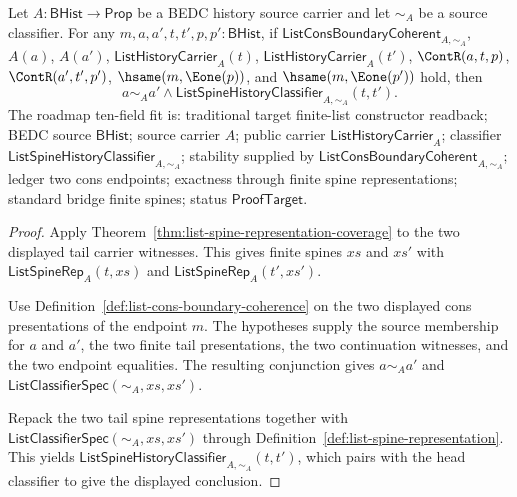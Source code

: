 \begin{theorem}
\label{thm:list-public-cons-readback-deterministic}
Let $A:\mathsf{BHist}\to\mathsf{Prop}$ be a BEDC history source carrier and let
$\sim_A$ be a source classifier. For any
$m,a,a',t,t',p,p':\mathsf{BHist}$, if
$\mathsf{ListConsBoundaryCoherent}_{A,\sim_A}$,
$A(a)$, $A(a')$, $\mathsf{ListHistoryCarrier}_A(t)$,
$\mathsf{ListHistoryCarrier}_A(t')$, $\ContR(a,t,p)$,
$\ContR(a',t',p')$, $\hsame(m,\Eone(p))$, and
$\hsame(m,\Eone(p'))$ hold, then
$$
a\sim_A a'\land
\mathsf{ListSpineHistoryClassifier}_{A,\sim_A}(t,t').
$$
The roadmap ten-field fit is: traditional target finite-list constructor
readback; BEDC source $\mathsf{BHist}$; source carrier $A$; public carrier
$\mathsf{ListHistoryCarrier}_A$; classifier
$\mathsf{ListSpineHistoryClassifier}_{A,\sim_A}$; stability supplied by
$\mathsf{ListConsBoundaryCoherent}_{A,\sim_A}$; ledger two cons endpoints;
exactness through finite spine representations; standard bridge finite spines;
status $\mathsf{ProofTarget}$.
\end{theorem}
\begin{proof}
Apply Theorem~\ref{thm:list-spine-representation-coverage} to the two displayed
tail carrier witnesses. This gives finite spines $xs$ and $xs'$ with
$\mathsf{ListSpineRep}_A(t,xs)$ and
$\mathsf{ListSpineRep}_A(t',xs')$.

Use Definition~\ref{def:list-cons-boundary-coherence} on the two displayed cons
presentations of the endpoint $m$. The hypotheses supply the source membership
for $a$ and $a'$, the two finite tail presentations, the two continuation
witnesses, and the two endpoint equalities. The resulting conjunction gives
$a\sim_A a'$ and $\mathsf{ListClassifierSpec}(\sim_A,xs,xs')$.

Repack the two tail spine representations together with
$\mathsf{ListClassifierSpec}(\sim_A,xs,xs')$ through
Definition~\ref{def:list-spine-representation}. This yields
$\mathsf{ListSpineHistoryClassifier}_{A,\sim_A}(t,t')$, which pairs with the
head classifier to give the displayed conclusion.
\end{proof}

